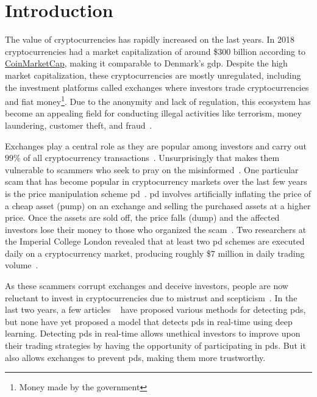 
\chapter{Introduction}\label{ch:introduction}\glsresetall
The value of cryptocurrencies has rapidly increased on the last years. In 2018 cryptocurrencies had a market capitalization of around \$$300$ billion according to \href{https://coinmarketcap.com/}{CoinMarketCap}, making it comparable to Denmark's \ac{gdp}\cite{P&D_to_the_moon}. Despite the high market capitalization, these cryptocurrencies are mostly unregulated, including the investment platforms called exchanges where investors trade cryptocurrencies and fiat money\footnote{Money made by the government\cite{fiat}}. Due to the anonymity and lack of regulation, this ecosystem has become an appealing field for conducting illegal activities like terrorism, money laundering, customer theft, and fraud~\cite{bitcoin_regulation}.

Exchanges play a central role as they are popular among investors and carry out $99\%$ of all cryptocurrency transactions~\cite{coinsutra}. Unsurprisingly that makes them vulnerable to scammers who seek to pray on the misinformed~\cite{P&D_to_the_moon}. One particular scam that has become popular in cryptocurrency markets over the last few years is the price manipulation scheme \ac{pd}~\cite{P&D_anatomy}. \ac{pd} involves artificially inflating the price of a cheap asset (pump) on an exchange and selling the purchased assets at a higher price. Once the assets are sold off, the price falls (dump) and the affected investors lose their money to those who organized the scam~\cite{P&D_scheme}. Two researchers at the Imperial College London revealed that at least two \ac{pd} schemes are executed daily on a cryptocurrency market, producing roughly \$$7$ million in daily trading volume~\cite{P&D_anatomy}.

As these scammers corrupt exchanges and deceive investors, people are now reluctant to invest in cryptocurrencies due to mistrust and scepticism~\cite{anchor}. In the last two years, a few articles ~\cite{P&D_to_the_moon, P&D_anatomy, P&D_scheme, P&D_pumping} have proposed various methods for detecting \acp{pd}, but none have yet proposed a model that detects \acp{pd} in real-time using deep learning. Detecting \acp{pd} in real-time allows unethical investors to improve upon their trading strategies by having the opportunity of participating in \acp{pd}. But it also allows exchanges to prevent \acp{pd}, making them more trustworthy. 

